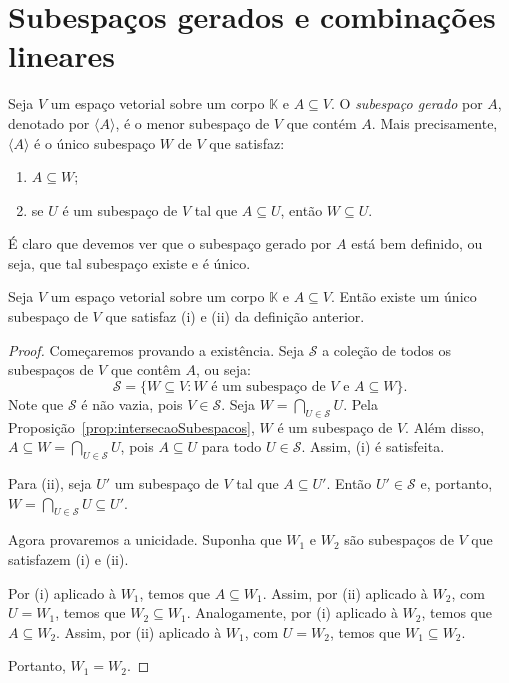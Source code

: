 \section{Subespaços gerados e combinações lineares}

\begin{definition}
    Seja $V$ um espaço vetorial sobre um corpo $\mathbb K$ e $A \subseteq V$.
    O \emph{subespaço gerado} por $A$, denotado por $\langle A \rangle$, é o menor subespaço de $V$ que contém $A$.
    Mais precisamente, $\langle A\rangle$ é o único subespaço $W$ de $V$ que satisfaz:
    \begin{enumerate}[label=(\roman*)]
        \item $A \subseteq W$;
        \item se $U$ é um subespaço de $V$ tal que $A \subseteq U$, então $W \subseteq U$.
    \end{enumerate}
\end{definition}
É claro que devemos ver que o subespaço gerado por $A$ está bem definido, ou seja, que tal subespaço existe e é único.
\begin{lemma}
    Seja $V$ um espaço vetorial sobre um corpo $\mathbb K$ e $A \subseteq V$.
    Então existe um único subespaço de $V$ que satisfaz (i) e (ii) da definição anterior.
\end{lemma}
\begin{proof}
    Começaremos provando a existência.
    Seja $\mathcal S$ a coleção de todos os subespaços de $V$ que contêm $A$, ou seja:
    \begin{equation*}
        \mathcal S = \{W \subseteq V : W \text{ é um subespaço de } V \text{ e } A \subseteq W\}.
    \end{equation*}
    Note que $\mathcal S$ é não vazia, pois $V \in \mathcal S$.
    Seja $W = \bigcap_{U \in \mathcal S} U$.
    Pela Proposição~\ref{prop:intersecaoSubespacos}, $W$ é um subespaço de $V$.
    Além disso, $A \subseteq W=\bigcap_{U \in \mathcal S} U$, pois $A \subseteq U$ para todo $U \in \mathcal S$.
    Assim, (i) é satisfeita.

    Para (ii), seja $U'$ um subespaço de $V$ tal que $A \subseteq U'$.
    Então $U' \in \mathcal S$ e, portanto, $W = \bigcap_{U \in \mathcal S} U \subseteq U'$.

    Agora provaremos a unicidade.
    Suponha que $W_1$ e $W_2$ são subespaços de $V$ que satisfazem (i) e (ii).

    Por (i) aplicado à $W_1$, temos que $A \subseteq W_1$.
    Assim, por (ii) aplicado à $W_2$, com $U=W_1$, temos que $W_2 \subseteq W_1$.
    Analogamente, por (i) aplicado à $W_2$, temos que $A \subseteq W_2$.
    Assim, por (ii) aplicado à $W_1$, com $U=W_2$, temos que $W_1 \subseteq W_2$.

    Portanto, $W_1 = W_2$.
\end{proof}